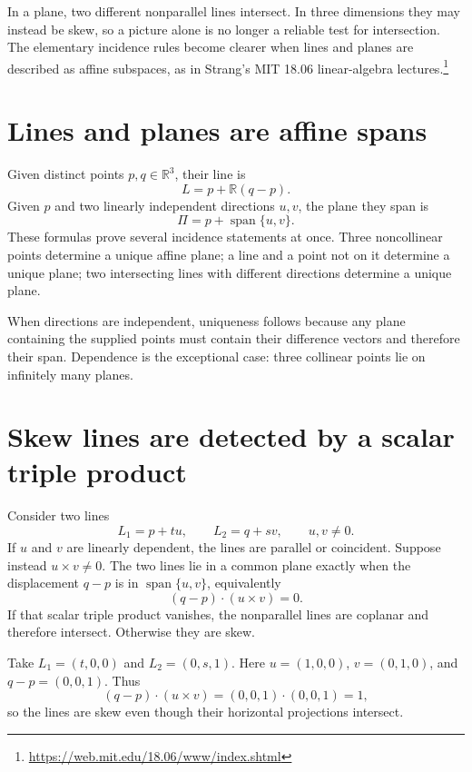
In a plane, two different nonparallel lines intersect. In three dimensions they may instead be skew, so a picture alone is no longer a reliable test for intersection. The elementary incidence rules become clearer when lines and planes are described as affine subspaces, as in Strang's MIT 18.06 linear-algebra lectures.\footnote{\url{https://web.mit.edu/18.06/www/index.shtml}}

\section{Lines and planes are affine spans}

Given distinct points \(p,q\in\mathbb R^3\), their line is
\[
 L=p+\mathbb R(q-p).
\]
Given \(p\) and two linearly independent directions \(u,v\), the plane they span is
\[
 \Pi=p+\operatorname{span}\{u,v\}.
\]
These formulas prove several incidence statements at once. Three noncollinear points determine a unique affine plane; a line and a point not on it determine a unique plane; two intersecting lines with different directions determine a unique plane.

When directions are independent, uniqueness follows because any plane containing the supplied points must contain their difference vectors and therefore their span. Dependence is the exceptional case: three collinear points lie on infinitely many planes.

\section{Skew lines are detected by a scalar triple product}

Consider two lines
\[
 L_1=p+tu,\qquad L_2=q+sv,\qquad u,v\ne0.
\]
If \(u\) and \(v\) are linearly dependent, the lines are parallel or coincident. Suppose instead \(u\times v\ne0\). The two lines lie in a common plane exactly when the displacement \(q-p\) is in \(\operatorname{span}\{u,v\}\), equivalently
\[
 \boxed{(q-p)\cdot(u\times v)=0.}
\]
If that scalar triple product vanishes, the nonparallel lines are coplanar and therefore intersect. Otherwise they are skew.

\begin{example}
Take \(L_1=(t,0,0)\) and \(L_2=(0,s,1)\). Here \(u=(1,0,0)\), \(v=(0,1,0)\), and \(q-p=(0,0,1)\). Thus
\[
 (q-p)\cdot(u\times v)=(0,0,1)\cdot(0,0,1)=1,
\]
so the lines are skew even though their horizontal projections intersect.
\end{example}

